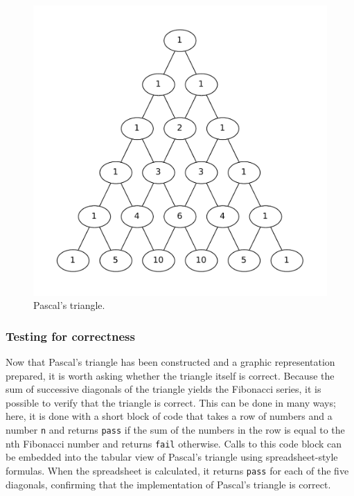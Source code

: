 \documentclass[article,shortnames]{jss}
\begin{document}






\begin{figure}[t!]
\centering
\includegraphics[width=0.6\linewidth]{pascals-triangle.pdf}
\caption{Pascal's triangle. \label{pascals-triangle-fig}}
\end{figure}
\subsubsection{Testing for correctness}
\label{sec-4-1-3}

Now that Pascal's triangle has been constructed and a graphic
representation prepared, it is worth asking whether the triangle
itself is correct.  Because the sum of successive diagonals of the
triangle yields the Fibonacci series, it is possible to verify that
the triangle is correct.  This can be done in many ways; here, it is
done with a short block of  code that takes a row of numbers
and a number \texttt{n} and returns \texttt{pass} if the sum of the numbers in the
row is equal to the nth Fibonacci number and returns \texttt{fail} otherwise.
Calls to this code block can be embedded into the tabular view of
Pascal's triangle using spreadsheet-style formulas.  When the
spreadsheet is calculated, it returns \texttt{pass} for each of the five
diagonals, confirming that the implementation of Pascal's triangle is
correct.
\end{document}
